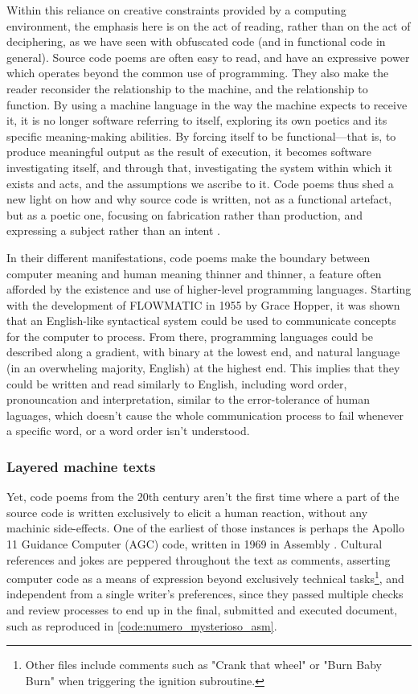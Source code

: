 Within this reliance on creative constraints provided by a computing environment, the emphasis here is on the act of reading, rather than on the act of deciphering, as we have seen with obfuscated code (and in functional code in general). Source code poems are often easy to read, and have an expressive power which operates beyond the common use of programming. They also make the reader reconsider the relationship to the machine, and the relationship to function. By using a machine language in the way the machine expects to receive it, it is no longer software referring to itself, exploring its own poetics and its specific meaning-making abilities. By forcing itself to be functional—that is, to produce meaningful output as the result of execution, it becomes software investigating itself, and through that, investigating the system within which it exists and acts, and the assumptions we ascribe to it. Code poems thus shed a new light on how and why source code is written, not as a functional artefact, but as a poetic one, focusing on fabrication rather than production, and expressing a subject rather than an intent \citep{paloque-berges_poetique_2009}.

In their different manifestations, code poems make the boundary between computer meaning and human meaning thinner and thinner, a feature often afforded by the existence and use of higher-level programming languages. Starting with the development of FLOWMATIC in 1955 by Grace Hopper, it was shown that an English-like syntactical system could be used to communicate concepts for the computer to process. From there, programming languages could be described along a gradient, with binary at the lowest end, and natural language (in an overwheling majority, English) at the highest end. This implies that they could be written and read similarly to English, including word order, pronouncation and interpretation, similar to the error-tolerance of human laguages, which doesn't cause the whole communication process to fail whenever a specific word, or a word order isn't understood.

\subsubsection{Layered machine texts}
\label{subsubsec:layered-machine-texts}

Yet, code poems from the 20th century aren't the first time where a part of the source code is written exclusively to elicit a human reaction, without any machinic side-effects. One of the earliest of those instances is perhaps the Apollo 11 Guidance Computer (AGC) code, written in 1969 in Assembly \citep{garry_lunar_1969}. Cultural references and jokes are peppered throughout the text as comments, asserting computer code as a means of expression beyond exclusively technical tasks\footnote{Other files include comments such as "Crank that wheel" or "Burn Baby Burn" when triggering the ignition subroutine.}, and independent from a single writer's preferences, since they passed multiple checks and review processes to end up in the final, submitted and executed document, such as reproduced in \ref{code:numero_mysterioso_asm}.

